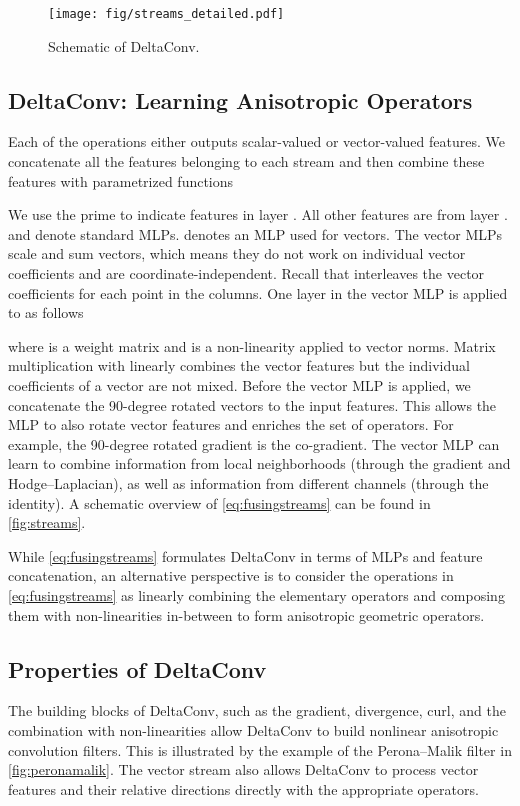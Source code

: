 \documentclass[acmtog, authorversion]{acmart}
\begin{document}
\begin{figure}[t]
    \centering
    \texttt{[image: fig/streams\_detailed.pdf]}
    \caption{Schematic of DeltaConv.}
    \label{fig:streams}
\end{figure}

\subsection{DeltaConv: Learning Anisotropic Operators}
Each of the operations either outputs scalar-valued or vector-valued features. We concatenate all the features belonging to each stream and then combine these features with parametrized functions

We use the prime to indicate features in layer . All other features are from layer .  and  denote standard MLPs.  denotes an MLP used for vectors.
The vector MLPs scale and sum vectors, which means they do not work on individual vector coefficients and are coordinate-independent. Recall that  interleaves the vector coefficients for each point in the columns. One layer in the vector MLP is applied to  as follows

where  is a weight matrix and  is a non-linearity applied to vector norms.
Matrix multiplication with  linearly combines the vector features but the individual coefficients of a vector are not mixed. Before the vector MLP is applied, we concatenate the 90-degree rotated vectors to the input features. This allows the MLP to also rotate vector features and enriches the set of operators. For example, the 90-degree rotated gradient is the co-gradient. The vector MLP can learn to combine information from local neighborhoods (through the gradient and Hodge--Laplacian), as well as information from different channels (through the identity). A schematic overview of \autoref{eq:fusingstreams} can be found in \autoref{fig:streams}.

While \autoref{eq:fusingstreams} formulates DeltaConv in terms of MLPs and feature concatenation, an alternative perspective is to consider the operations in \autoref{eq:fusingstreams} as linearly combining the elementary operators and composing them with non-linearities in-between to form anisotropic geometric operators.

\subsection{Properties of DeltaConv}
The building blocks of DeltaConv, such as the gradient, divergence, curl, and the combination with non-linearities allow DeltaConv to build nonlinear anisotropic convolution filters. This is illustrated by the example of the Perona--Malik filter in \autoref{fig:peronamalik}.
The vector stream also allows DeltaConv to process vector features and their relative directions directly with the appropriate operators.
\end{document}
